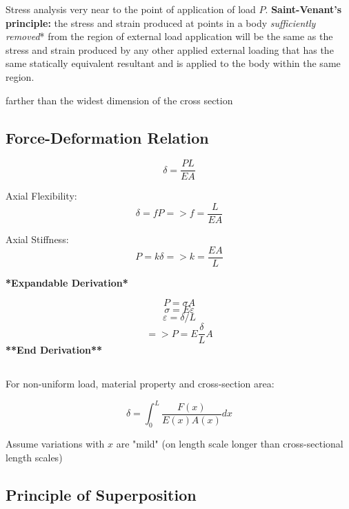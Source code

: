Stress analysis very near to the point of application of load $P$. \textbf{Saint-Venant's principle:} the stress and strain produced at points in a body \textit{sufficiently removed}* from the region of external load application will be the same as the stress and strain produced by any other applied external loading that has the same statically equivalent resultant and is applied to the body within the same region. 

\noindent *farther than the widest dimension of the cross section


\subsection{Force-Deformation Relation}

\[\delta = \frac{PL}{EA}\]

\noindent Axial Flexibility: \[\delta = fP   =>   f = \frac{L}{EA}\]

\noindent Axial Stiffness: \[P = k\delta   =>   k = \frac{EA}{L}\]

\noindent \textbf{*Expandable Derivation*}

\[P = \sigma A\]
\[\sigma = E\varepsilon\]
\[\varepsilon = \delta / L\]
\[=>   P = E\frac{\delta}{L}A\]
\noindent \textbf{**End Derivation**}

\subsection{} 
For non-uniform load, material property and cross-section area:

 \[\delta = \int_0^L\frac{F(x)}{E(x)A(x)}dx\]

\noindent Assume variations with $x$ are "mild" (on length scale longer than cross-sectional length scales)

\noindent {}

\subsection{Principle of Superposition }

